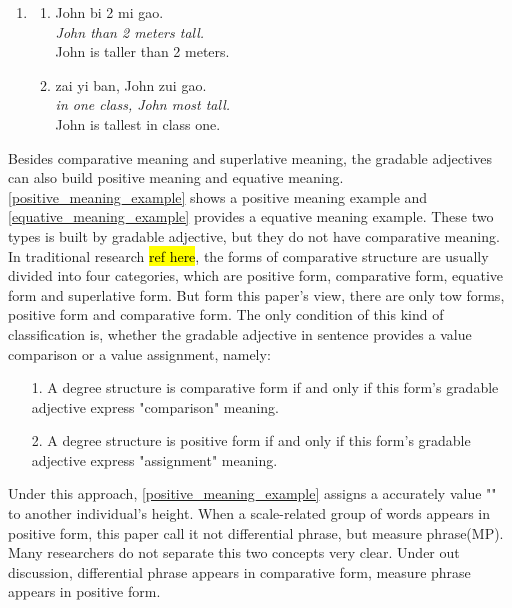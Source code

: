 \documentclass{ctexart}
\begin{document}
\begin{enumerate}[resume]
    \item
    \begin{enumerate}[ref=(\arabic{enumi}\alph*)]
        \item \label{specific_value_comparison_example}
        John bi 2 mi gao.\\
        \textit{John than 2 meters tall.} \\
        John is taller than 2 meters.

        \item \label{individual_set_comparison_example}
        zai yi ban, John zui gao.\\
        \textit{in one class, John most tall.}\\
        John is tallest in class one.

    \end{enumerate}
\end{enumerate}

Besides comparative meaning and superlative meaning, the gradable adjectives can also build positive meaning and equative meaning. \ref{positive_meaning_example} shows a positive meaning example and \ref{equative_meaning_example} provides a equative meaning example. These two types is built by gradable adjective, but they do not have comparative meaning. In traditional research \hl{ref here}, the forms of comparative structure are usually divided into four categories, which are positive form, comparative form, equative form and superlative form. But form this paper's view, there are only tow forms, positive form and comparative form. The only condition of this kind of classification is, whether the gradable adjective in sentence provides a value comparison or a value assignment, namely:

\begin{itemize}
    \item[1.] A degree structure is comparative form if and only if this form's gradable adjective express "comparison" meaning.
    \item[2.] A degree structure is positive form if and only if this form's gradable adjective express "assignment" meaning.
\end{itemize}

Under this approach, \ref{positive_meaning_example} assigns a accurately value "" to another individual's height. When a scale-related group of words appears in positive form, this paper call it not differential phrase, but measure phrase(MP). Many researchers do not separate this two concepts very clear. Under out discussion, differential phrase appears in comparative form, measure phrase appears in positive form. 
\end{document}
